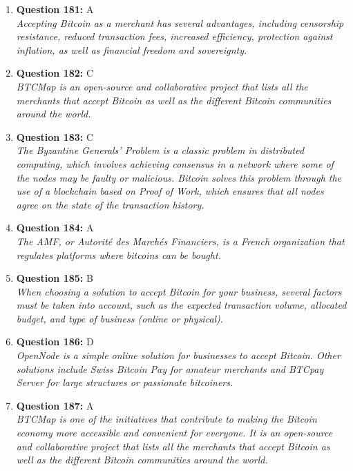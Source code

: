 \documentclass[12pt,a4paper]{article}
\begin{document}
\begin{enumerate}
\item \textbf{Question 181:} A
\\ \textit{Accepting Bitcoin as a merchant has several advantages, including censorship resistance, reduced transaction fees, increased efficiency, protection against inflation, as well as financial freedom and sovereignty.}

\item \textbf{Question 182:} C
\\ \textit{BTCMap is an open-source and collaborative project that lists all the merchants that accept Bitcoin as well as the different Bitcoin communities around the world.}

\item \textbf{Question 183:} C
\\ \textit{The Byzantine Generals' Problem is a classic problem in distributed computing, which involves achieving consensus in a network where some of the nodes may be faulty or malicious. Bitcoin solves this problem through the use of a blockchain based on Proof of Work, which ensures that all nodes agree on the state of the transaction history.}

\item \textbf{Question 184:} A
\\ \textit{The AMF, or Autorité des Marchés Financiers, is a French organization that regulates platforms where bitcoins can be bought.}

\item \textbf{Question 185:} B
\\ \textit{When choosing a solution to accept Bitcoin for your business, several factors must be taken into account, such as the expected transaction volume, allocated budget, and type of business (online or physical).}

\item \textbf{Question 186:} D
\\ \textit{OpenNode is a simple online solution for businesses to accept Bitcoin. Other solutions include Swiss Bitcoin Pay for amateur merchants and BTCpay Server for large structures or passionate bitcoiners.}

\item \textbf{Question 187:} A
\\ \textit{BTCMap is one of the initiatives that contribute to making the Bitcoin economy more accessible and convenient for everyone. It is an open-source and collaborative project that lists all the merchants that accept Bitcoin as well as the different Bitcoin communities around the world.}


\end{enumerate}
\end{document}
